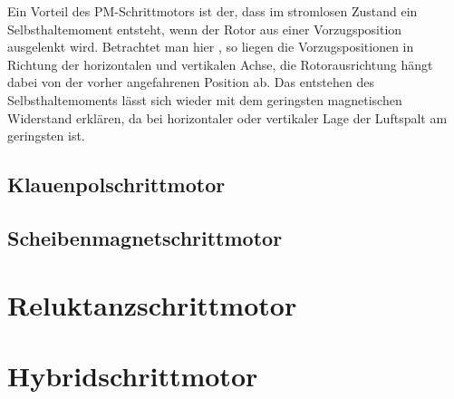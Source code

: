 Ein Vorteil des PM-Schrittmotors ist der, dass im stromlosen Zustand ein Selbsthaltemoment entsteht, wenn der Rotor aus einer Vorzugsposition ausgelenkt wird. Betrachtet man hier , so liegen die Vorzugspositionen in Richtung der horizontalen und vertikalen Achse, die Rotorausrichtung hängt dabei von der vorher angefahrenen Position ab. Das entstehen des Selbsthaltemoments lässt sich wieder mit dem geringsten magnetischen Widerstand erklären, da bei horizontaler oder vertikaler Lage der Luftspalt am geringsten ist.

\subsection{Klauenpolschrittmotor}

\subsection{Scheibenmagnetschrittmotor}

\section{Reluktanzschrittmotor}

\section{Hybridschrittmotor}
